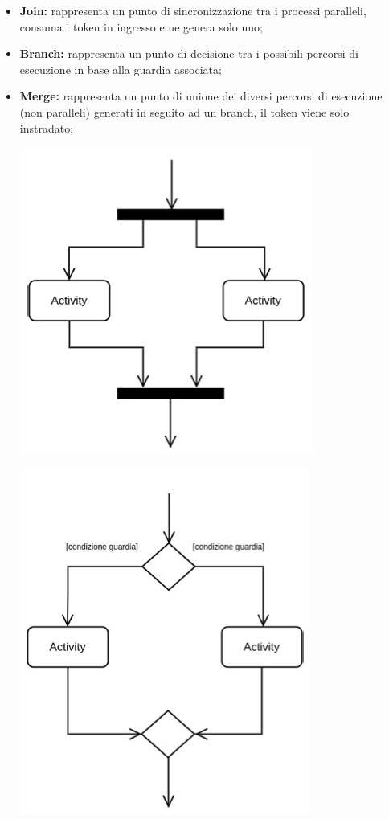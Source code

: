 \begin{itemize}
	\item \textbf{Join:} rappresenta un punto di sincronizzazione tra i processi paralleli, consuma i token in ingresso e ne genera solo uno;
	\item \textbf{Branch:} rappresenta un punto di decisione tra i possibili percorsi di esecuzione in base alla guardia associata;
	\item \textbf{Merge:} rappresenta un punto di unione dei diversi percorsi di esecuzione (non paralleli) generati in seguito ad un branch, il token viene solo instradato;
	\begin{center}
		\begin{minipage}{0.4\textwidth}
			\centering
			\includegraphics[scale=0.453]{Immagini/UML/ForkJoin}
		\end{minipage}
		\begin{minipage}{0.4\textwidth}
			\centering
			\includegraphics[scale=0.4]{Immagini/UML/BranchMerge}

\end{minipage}
\end{center}
\end{itemize}
